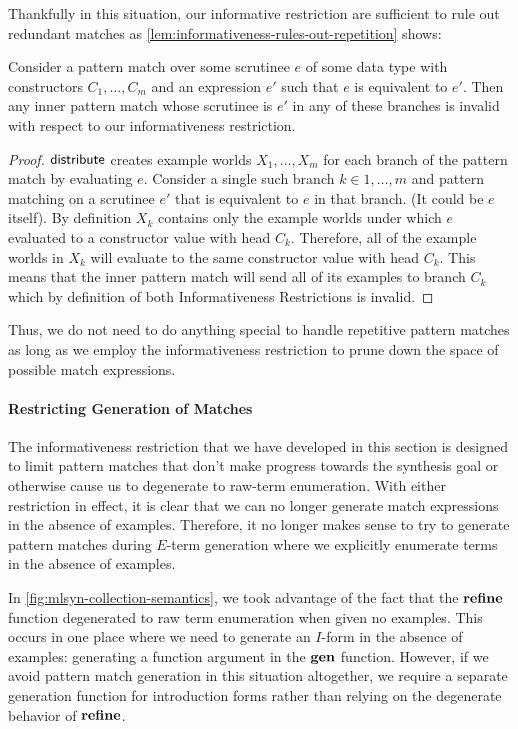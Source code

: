 Thankfully in this situation, our informative restriction are sufficient to rule out redundant matches as \autoref{lem:informativeness-rules-out-repetition} shows:
\begin{proofenv}
  \begin{lemma}
    Consider a pattern match over some scrutinee $e$ of some data type with constructors $C_1, …, C_m$ and an expression $e'$ such that $e$ is equivalent to $e'$.
    Then any inner pattern match whose scrutinee is $e'$ in any of these branches is invalid with respect to our informativeness restriction.
    \label{lem:informativeness-rules-out-repetition}
  \end{lemma}
  \begin{proof}
    $\mathsf{distribute}$ creates example worlds $Χ_1, …, Χ_m$ for each branch of the pattern match by evaluating $e$.
    Consider a single such branch $k ∈ 1, …, m$ and pattern matching on a scrutinee $e'$ that is equivalent to $e$ in that branch.
    (It could be $e$ itself).
    By definition $Χ_k$ contains only the example worlds under which $e$ evaluated to a constructor value with head $C_k$.
    Therefore, all of the example worlds in $Χ_k$ will evaluate to the same constructor value with head $C_k$.
    This means that the inner pattern match will send all of its examples to branch $C_k$ which by definition of both Informativeness Restrictions is invalid.
  \end{proof}
\end{proofenv}
Thus, we do not need to do anything special to handle repetitive pattern matches as long as we employ the informativeness restriction to prune down the space of possible match expressions.

\paragraph{Restricting Generation of Matches}

The informativeness restriction that we have developed in this section is designed to limit pattern matches that don't make progress towards the synthesis goal or otherwise cause us to degenerate to raw-term enumeration.
With either restriction in effect, it is clear that we can no longer generate match expressions in the absence of examples.
Therefore, it no longer makes sense to try to generate pattern matches during $E$-term generation where we explicitly enumerate terms in the absence of examples.

In \autoref{fig:mlsyn-collection-semantics}, we took advantage of the fact that the $\mathbf{refine}$ function degenerated to raw term enumeration when given no examples.
This occurs in one place where we need to generate an $I$-form in the absence of examples: generating a function argument in the $\mathbf{gen}$ function.
However, if we avoid pattern match generation in this situation altogether, we require a separate generation function for introduction forms rather than relying on the degenerate behavior of $\mathbf{refine}$.

